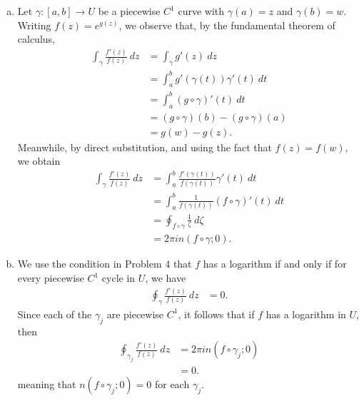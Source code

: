\documentclass[10pt]{mypackage}
\begin{document}
\begin{solution}\hfill
  \begin{enumerate}[(a)]
    \item Let $\gamma\colon [a,b]\rightarrow U$ be a piecewise $C^{1}$ curve with $\gamma(a) = z$  and $\gamma(b) = w$. Writing $f(z) = e^{g(z)}$, we observe that, by the fundamental theorem of calculus,
      \begin{align*}
        \int_{\gamma}^{} \frac{f'(z)}{f(z)}\:dz &= \int_{\gamma}^{} g'(z)\:dz\\
                                                &= \int_{a}^{b} g'\left( \gamma(t) \right)\gamma'(t)\:dt\\
                                                &= \int_{a}^{b} \left( g\circ\gamma \right)'(t)\:dt\\
                                                &= \left( g\circ\gamma \right)(b) - \left( g\circ\gamma \right)(a)\\
                                                &= g(w)-g(z).
      \end{align*}
      Meanwhile, by direct substitution, and using the fact that $f(z) = f(w)$, we obtain
      \begin{align*}
        \int_{\gamma}^{} \frac{f'(z)}{f(z)}\:dz &= \int_{a}^{b} \frac{f'\left( \gamma(t) \right)}{f\left( \gamma(t) \right)} \gamma'(t)\:dt\\
                                                &= \int_{a}^{b} \frac{1}{f\left( \gamma(t) \right)}\left( f\circ\gamma \right)'(t)\:dt\\
                                                &= \oint_{f\circ\gamma}^{} \frac{1}{\zeta}\:d\zeta\\
                                                &= 2\pi i n\left( f\circ\gamma;0 \right).
      \end{align*}
    \item We use the condition in Problem 4 that $f$ has a logarithm if and only if for every piecewise $C^{1}$ cycle in $U$, we have
      \begin{align*}
        \oint_{\gamma}^{} \frac{f'(z)}{f(z)}\:dz &= 0.
      \end{align*}
      Since each of the $\gamma_j$ are piecewise $C^{1}$, it follows that if $f$ has a logarithm in $U$, then
      \begin{align*}
        \oint_{\gamma_j}^{} \frac{f'(z)}{f(z)}\:dz &= 2\pi i n\left( f\circ\gamma_j;0 \right)\\
                                                   &= 0.
      \end{align*}
      meaning that $n\left( f\circ\gamma_j;0 \right) = 0$ for each $\gamma_j$.\newline


\end{enumerate}
\end{solution}
\end{document}
